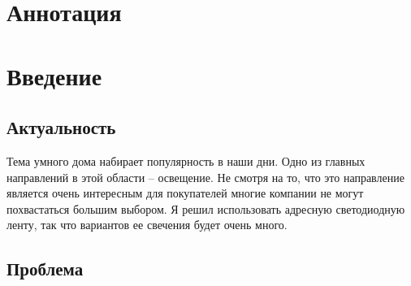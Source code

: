 \documentclass[a4paper, 12pt]{article}
\renewcommand{\sectionmark}[1]{\markright{#1}}
\begin{document}
\thispagestyle{fancy}
\renewcommand{\sectionmark}[1]{\markright{#1}}
\fancyhf{}
\fancyhead[R]{\bfseries\thepage}
\renewcommand{\contentsname}{Оглавление}
\small{\tableofcontents}
\newpage
\pagestyle{fancy}
\renewcommand{\sectionmark}[1]{\markright{#1}}
\fancyhf{}
\fancyhead[R]{\bfseries\thepage}
\fancyhead[LO]{\bfseries\rightmark}

\section{Аннотация}

\newpage
\section{Введение}
\subsection{Актуальность}




Тема умного дома набирает популярность в наши дни. Одно из главных направлений 
в этой области -- освещение. Не смотря на то, что это направление является 
очень интересным для покупателей многие компании не могут похвастаться большим
выбором. Я решил использовать адресную светодиодную ленту, так что 
вариантов ее свечения будет очень много. 

\subsection{Проблема}
\end{document}
